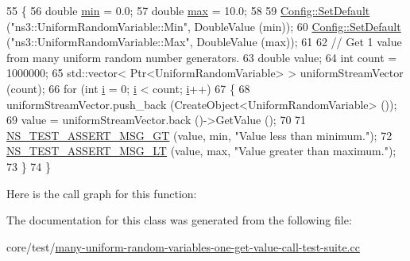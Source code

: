 \begin{DoxyCode}
55 \{
56   \textcolor{keywordtype}{double} \hyperlink{80211b_8c_ac6afabdc09a49a433ee19d8a9486056d}{min} = 0.0;
57   \textcolor{keywordtype}{double} \hyperlink{80211b_8c_affe776513b24d84b39af8ab0930fef7f}{max} = 10.0;
58 
59   \hyperlink{group__config_ga2e7882df849d8ba4aaad31c934c40c06}{Config::SetDefault} (\textcolor{stringliteral}{"ns3::UniformRandomVariable::Min"}, DoubleValue (min));
60   \hyperlink{group__config_ga2e7882df849d8ba4aaad31c934c40c06}{Config::SetDefault} (\textcolor{stringliteral}{"ns3::UniformRandomVariable::Max"}, DoubleValue (max));
61 
62   \textcolor{comment}{// Get 1 value from many uniform random number generators.}
63   \textcolor{keywordtype}{double} value;
64   \textcolor{keywordtype}{int} count = 1000000;
65   std::vector< Ptr<UniformRandomVariable> > uniformStreamVector (count);
66   \textcolor{keywordflow}{for} (\textcolor{keywordtype}{int} \hyperlink{bernuolliDistribution_8m_a6f6ccfcf58b31cb6412107d9d5281426}{i} = 0; \hyperlink{bernuolliDistribution_8m_a6f6ccfcf58b31cb6412107d9d5281426}{i} < count; \hyperlink{bernuolliDistribution_8m_a6f6ccfcf58b31cb6412107d9d5281426}{i}++)
67     \{
68       uniformStreamVector.push\_back (CreateObject<UniformRandomVariable> ());
69       value = uniformStreamVector.back ()->GetValue ();
70 
71       \hyperlink{group__testing_ga868cfb773df312b867a506bdd2e3cbef}{NS\_TEST\_ASSERT\_MSG\_GT} (value, min, \textcolor{stringliteral}{"Value less than minimum."});
72       \hyperlink{group__testing_ga1d96848b91407c9a0b36583e8b0ad7ae}{NS\_TEST\_ASSERT\_MSG\_LT} (value, max, \textcolor{stringliteral}{"Value greater than maximum."});
73     \}
74 \}
\end{DoxyCode}


Here is the call graph for this function\+:




The documentation for this class was generated from the following file\+:\begin{DoxyCompactItemize}
\item 
core/test/\hyperlink{many-uniform-random-variables-one-get-value-call-test-suite_8cc}{many-\/uniform-\/random-\/variables-\/one-\/get-\/value-\/call-\/test-\/suite.\+cc}\end{DoxyCompactItemize}
